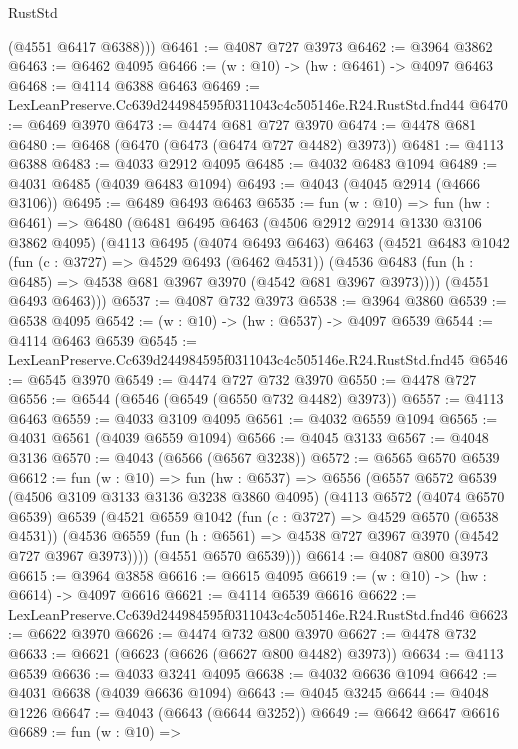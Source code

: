 \begin{lexlean}{RustStd}
\begin{coremodule}
        (@4551 @6417 @6388)))
@6461 := @4087 @727 @3973
@6462 := @3964 @3862
@6463 := @6462 @4095
@6466 := (w : @10) -> (hw : @6461) -> @4097 @6463
@6468 := @4114 @6388 @6463
@6469 := LexLeanPreserve.Cc639d244984595f0311043c4c505146e.R24.RustStd.fnd44
@6470 := @6469 @3970
@6473 := @4474 @681 @727 @3970
@6474 := @4478 @681
@6480 := @6468 (@6470 (@6473 (@6474 @727 @4482) @3973))
@6481 := @4113 @6388
@6483 := @4033 @2912 @4095
@6485 := @4032 @6483 @1094
@6489 := @4031 @6485 (@4039 @6483 @1094)
@6493 := @4043 (@4045 @2914 (@4666 @3106))
@6495 := @6489 @6493 @6463
@6535 := fun (w : @10) =>
  fun (hw : @6461) =>
  @6480
    (@6481
      @6495
      @6463
      (@4506 @2912 @2914 @1330 @3106 @3862 @4095)
      (@4113
        @6495
        (@4074 @6493 @6463)
        @6463
        (@4521
          @6483
          @1042
          (fun (c : @3727) => @4529 @6493 (@6462 @4531))
          (@4536 @6483 (fun (h : @6485) => @4538 @681 @3967 @3970 (@4542 @681 @3967 @3973))))
        (@4551 @6493 @6463)))
@6537 := @4087 @732 @3973
@6538 := @3964 @3860
@6539 := @6538 @4095
@6542 := (w : @10) -> (hw : @6537) -> @4097 @6539
@6544 := @4114 @6463 @6539
@6545 := LexLeanPreserve.Cc639d244984595f0311043c4c505146e.R24.RustStd.fnd45
@6546 := @6545 @3970
@6549 := @4474 @727 @732 @3970
@6550 := @4478 @727
@6556 := @6544 (@6546 (@6549 (@6550 @732 @4482) @3973))
@6557 := @4113 @6463
@6559 := @4033 @3109 @4095
@6561 := @4032 @6559 @1094
@6565 := @4031 @6561 (@4039 @6559 @1094)
@6566 := @4045 @3133
@6567 := @4048 @3136
@6570 := @4043 (@6566 (@6567 @3238))
@6572 := @6565 @6570 @6539
@6612 := fun (w : @10) =>
  fun (hw : @6537) =>
  @6556
    (@6557
      @6572
      @6539
      (@4506 @3109 @3133 @3136 @3238 @3860 @4095)
      (@4113
        @6572
        (@4074 @6570 @6539)
        @6539
        (@4521
          @6559
          @1042
          (fun (c : @3727) => @4529 @6570 (@6538 @4531))
          (@4536 @6559 (fun (h : @6561) => @4538 @727 @3967 @3970 (@4542 @727 @3967 @3973))))
        (@4551 @6570 @6539)))
@6614 := @4087 @800 @3973
@6615 := @3964 @3858
@6616 := @6615 @4095
@6619 := (w : @10) -> (hw : @6614) -> @4097 @6616
@6621 := @4114 @6539 @6616
@6622 := LexLeanPreserve.Cc639d244984595f0311043c4c505146e.R24.RustStd.fnd46
@6623 := @6622 @3970
@6626 := @4474 @732 @800 @3970
@6627 := @4478 @732
@6633 := @6621 (@6623 (@6626 (@6627 @800 @4482) @3973))
@6634 := @4113 @6539
@6636 := @4033 @3241 @4095
@6638 := @4032 @6636 @1094
@6642 := @4031 @6638 (@4039 @6636 @1094)
@6643 := @4045 @3245
@6644 := @4048 @1226
@6647 := @4043 (@6643 (@6644 @3252))
@6649 := @6642 @6647 @6616
@6689 := fun (w : @10) =>

\end{coremodule}
\end{lexlean}
